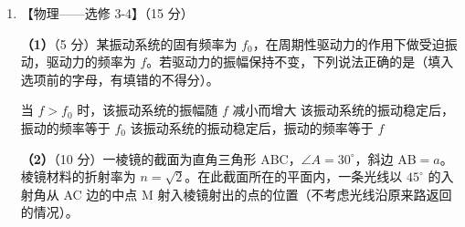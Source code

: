 \documentclass[\gkver]{gaokaozhenti}
\begin{document}
\begin{enumerate}
{由玻意耳定律得 $V=\frac{1.35p_{0}}{1.1p_{0}}\times2.2hS=2.7hS$ ④。

（ii）活塞 A 从最初位置升到最高点的过程为等压过程。该过程的初态体积和温度分别为 $2hS$ 和 $T_{0}=273\UK$，末态体积为 $2.7hS$。设末态温度为 $T$，由盖-吕萨克定律得 $T=\frac{2.7hS}{2hS}T_{0}=368.55\UK$ ⑤。
}

\item
【物理——选修 3-4】（15 分）

\textbf{（1）}（5 分）某振动系统的固有频率为 $f_{0}$，在周期性驱动力的作用下做受迫振动，驱动力的频率为 $f$。若驱动力的振幅保持不变，下列说法正确的是（填入选项前的字母，有填错的不得分）。

{当 $f>f_{0}$ 时，该振动系统的振幅随 $f$ 减小而增大}
{该振动系统的振动稳定后，振动的频率等于 $f_{0}$}
{该振动系统的振动稳定后，振动的频率等于 $f$}

\textbf{（2）}（10 分）一棱镜的截面为直角三角形 ABC，$\angle A=30^{\circ}$，斜边 AB$=a$。棱镜材料的折射率为 $n=\sqrt{2}$。在此截面所在的平面内，一条光线以 $45^{\circ}$ 的入射角从 AC 边的中点 M 射入棱镜射出的点的位置（不考虑光线沿原来路返回的情况）。


\end{enumerate}
\end{document}
